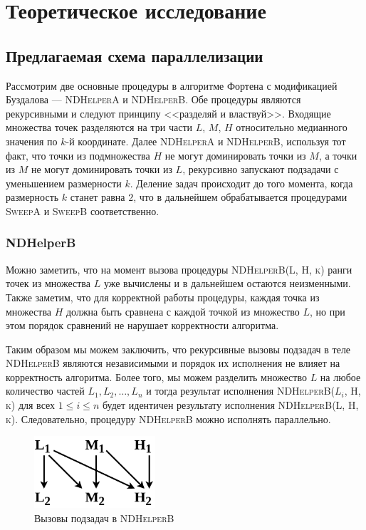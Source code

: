 \chapter{Теоретическое исследование}
\section{Предлагаемая схема параллелизации}
Рассмотрим две основные процедуры в алгоритме Фортена с модификацией Буздалова --- \textsc{NDHelperA} и \textsc{NDHelperB}.
Обе процедуры являются рекурсивными и следуют принципу <<разделяй и властвуй>>.
Входящие множества точек разделяются на три части $L$, $M$, $H$ относительно медианного значения по $k$-й координате.
Далее \textsc{NDHelperA} и \textsc{NDHelperB}, используя тот факт, что точки из подмножества $H$ не могут доминировать точки из $M$, а точки из $M$ не могут доминировать точки из $L$, рекурсивно запускают подзадачи с уменьшением размерности $k$.
Деление задач происходит до того момента, когда размерность $k$ станет равна $2$, что в дальнейшем обрабатывается процедурами \textsc{SweepA} и \textsc{SweepB} соответственно.

\subsection{NDHelperB}
Можно заметить, что на момент вызова процедуры \textsc{NDHelperB(L, H, k)} ранги точек из множества $L$ уже вычислены и в дальнейшем остаются неизменными.
Также заметим, что для корректной работы процедуры, каждая точка из множества $H$ должна быть сравнена с каждой точкой из множество $L$, но при этом порядок сравнений не нарушает корректности алгоритма.

Таким образом мы можем заключить, что рекурсивные вызовы подзадач в теле \textsc{NDHelperB} являются независимыми и порядок их исполнения не влияет на корректность алгоритма.
Более того, мы можем разделить множество $L$ на любое количество частей ${L_1, L_2,\ldots, L_n}$ и тогда результат исполнения \textsc{NDHelperB($L_i$, H, k)} для всех $1\leq i\leq n$ будет идентичен результату исполнения \textsc{NDHelperB(L, H, k)}.
Следовательно, процедуру \textsc{NDHelperB} можно исполнять параллельно.

\begin{figure}[h]
\centering
\includegraphics[width=0.4\textwidth]{images/ndb.png}
\caption{Вызовы подзадач в \textsc{NDHelperB}}
\end{figure}

